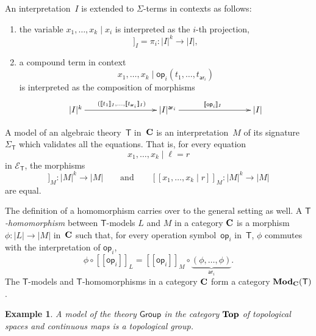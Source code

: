 \documentclass{amsart}
\newcommand{\theory}[1]{\mathsf{#1}} %
\newcommand{\signature}[1]{\Sigma_{\theory{#1}}} %
\newcommand{\equations}[1]{\mathcal{E}_{\theory{#1}}} %
\newcommand{\ModC}[2]{\text{\textbf{Mod}}_{#1}(\theory{#2})} %
\newcommand{\category}[1]{\text{\textbf{#1}}} %
\newcommand{\carrier}[1]{|#1|} %
\newcommand{\op}[1]{\mathsf{op}_{#1}} %
\newcommand{\arity}[1]{\mathsf{ar}_{#1}} %
\newcommand{\sem}[1]{[\![#1]\!]} %
\newtheorem{example}{Example}[section]
\begin{document}
An interpretation~$I$ is extended to $\Sigma$-terms in contexts as follows:
%
\begin{enumerate}
\item the variable $x_1, \ldots, x_k \mid x_i$ is interpreted as the $i$-th projection,
  \begin{equation*}
    \sem{x_1, \ldots, x_k \mid  x_i}_I = \pi_i : \carrier{I}^k \to \carrier{I},
  \end{equation*}
\item a compound term in context
  \begin{equation*}
    x_1, \ldots, x_k \mid \op{i}(t_1, \ldots, t_{\arity{i}})
  \end{equation*}
  is interpreted as the composition of morphisms
  \begin{equation*}
    \xymatrix@+6em{
      {\carrier{I}^k} \ar[r]^{(\sem{t_1}_I, \ldots, \sem{t_{\arity{i}}}_I)}
      &
      {\carrier{I}^{\arity{i}}} \ar[r]^{\sem{\op{i}}_I}
      &
      {\carrier{I}}
    }
  \end{equation*}
\end{enumerate}
%
A model of an algebraic theory~$\theory{T}$ in~$\category{C}$ is an interpretation~$M$ of
its signature $\signature{T}$ which validates all the equations. That is, for every
equation
%
\begin{equation*}
  x_1, \ldots, x_k \mid \ell = r
\end{equation*}
%
in $\equations{T}$, the morphisms
%
\begin{equation*}
  \sem{x_1, \ldots, x_k \mid \ell}_M : \carrier{M}^k \to \carrier{M}
  \qquad\text{and}\qquad
  \sem{x_1, \ldots, x_k \mid r}_M : \carrier{M}^k \to \carrier{M}
\end{equation*}
%
are equal.

The definition of a homomorphism carries over to the general setting as well. A
\emph{$\theory{T}$-homomorphism} between $\theory{T}$-models $L$ and $M$ in a category
$\category{C}$ is a morphism $\phi : \carrier{L} \to \carrier{M}$ in~$\category{C}$ such that, for every
operation symbol~$\op{i}$ in~$\theory{T}$, $\phi$ commutes with the interpretation of
$\op{i}$,
%
\begin{equation*}
  \phi \circ \sem{\op{i}}_L = \sem{\op{i}}_M \circ \underbrace{(\phi, \ldots, \phi)}_{\arity{i}}.
\end{equation*}
%
The $\theory{T}$-models and $\theory{T}$-homomorphisms in a category $\category{C}$ form a
category $\ModC{\category{C}}{T}$.

\begin{example}
  A model of the theory $\theory{Group}$ in the category $\category{Top}$ of
  topological spaces and continuous maps is a topological group.
\end{example}
\end{document}
